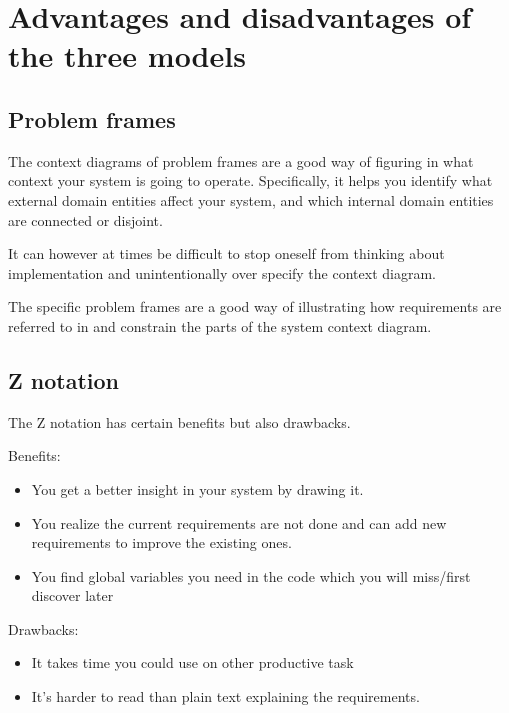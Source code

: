 \documentclass[Main_Assignment2]{subfiles}
\begin{document}
\section{Advantages and disadvantages of the three models}

	\subsection{Problem frames} %
	\label{sub:problem_frames}

	The context diagrams of problem frames are a good way of figuring in what context your system is going to operate.
	Specifically, it helps you identify what external domain entities affect your system, and which internal domain entities are connected or disjoint.

	It can however at times be difficult to stop oneself from thinking about implementation and unintentionally over specify the context diagram.

	The specific problem frames are a good way of illustrating how requirements are referred to in and constrain the parts of the system context diagram.



	\subsection{Z notation}
	The Z notation has certain benefits but also drawbacks.

	Benefits:
	\vspace{-10pt}
	\begin{itemize}
		\item You get a better insight in your system by drawing it.
		\item You realize the current requirements are not done and can add new requirements to improve the existing ones.
		\item You find global variables you need in the code which you will miss/first discover later
	\end{itemize}

	Drawbacks:
	\vspace{-10pt}
	\begin{itemize}
		\item It takes time you could use on other productive task
		\item It's harder to read than plain text explaining the requirements.
	\end{itemize}
\end{document}
